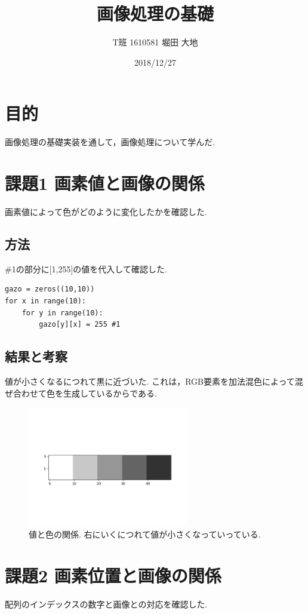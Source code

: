 \documentclass[twocolumn, 10pt,a4j]{jsarticle}
\title{\vspace{-2.5cm}画像処理の基礎}
\author{T班 1610581 堀田 大地}
\date{2018/12/27}
\begin{document}
\maketitle{}
\section{目的}
画像処理の基礎実装を通して，画像処理について学んだ.

\section{課題1 画素値と画像の関係}
  画素値によって色がどのように変化したかを確認した.
  \subsection{方法}
  \#1の部分に[1,255]の値を代入して確認した.
\begin{lstlisting}[caption=kadai1.py, label=p4_txt]
gazo = zeros((10,10))
for x in range(10):
    for y in range(10):
        gazo[y][x] = 255 #1
\end{lstlisting}

  \subsection{結果と考察}
    値が小さくなるにつれて黒に近づいた. これは，RGB要素を加法混色によって混ぜ合わせて色を生成しているからである.
    \begin{figure}[H]
    \begin{center}
        \includegraphics[width=7cm]{../img/kadai_1_value.png}
        \caption{値と色の関係. 右にいくにつれて値が小さくなっていっている.}
    \end{center}
    \end{figure}

\section{課題2 画素位置と画像の関係}
    配列のインデックスの数字と画像との対応を確認した.
    
\end{document}
